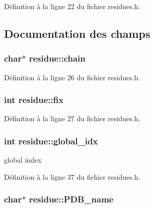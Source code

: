 Définition à la ligne 22 du fichier residues.\+h.



\subsection{Documentation des champs}
\hypertarget{structresidue_a817552a29072eb9ac772ec8b58e8bb49}{
\subsubsection[{chain}]{\setlength{\rightskip}{0pt plus 5cm}char$\ast$ residue\+::chain}}\label{structresidue_a817552a29072eb9ac772ec8b58e8bb49}


Définition à la ligne 26 du fichier residues.\+h.

\hypertarget{structresidue_a55a85fafae4a3379d93f4ab037ffe5c1}{
\subsubsection[{fix}]{\setlength{\rightskip}{0pt plus 5cm}int residue\+::fix}}\label{structresidue_a55a85fafae4a3379d93f4ab037ffe5c1}


Définition à la ligne 27 du fichier residues.\+h.

\hypertarget{structresidue_abf17ad732336d6b3254c99a6995b6402}{
\subsubsection[{global\+\_\+idx}]{\setlength{\rightskip}{0pt plus 5cm}int residue\+::global\+\_\+idx}}\label{structresidue_abf17ad732336d6b3254c99a6995b6402}


global index 



Définition à la ligne 37 du fichier residues.\+h.

\hypertarget{structresidue_a25af0aae0cd213a39bb9dedffcd25772}{
\subsubsection[{P\+D\+B\+\_\+name}]{\setlength{\rightskip}{0pt plus 5cm}char$\ast$ residue\+::\+P\+D\+B\+\_\+name}}\label{structresidue_a25af0aae0cd213a39bb9dedffcd25772}


